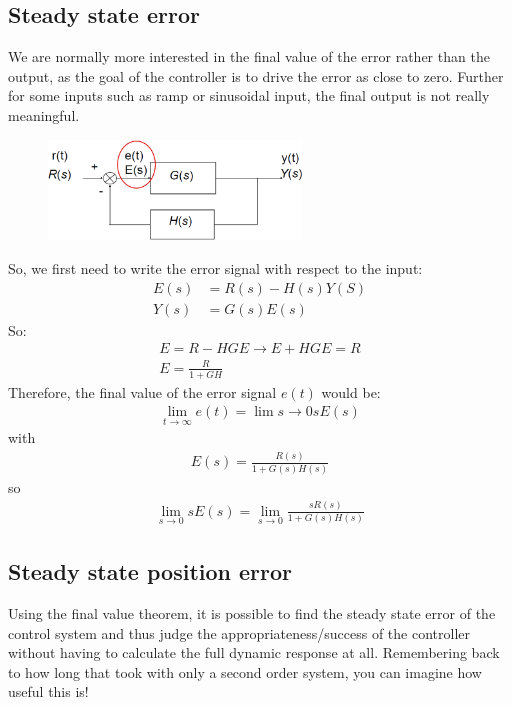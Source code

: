 \documentclass[class=report, crop=false, 12pt,a4paper]{standalone}
\begin{document}
\subsection{Steady state error}
We are normally more interested in the final value of the error rather than the output, as the goal of the controller is to drive the error as close to zero. Further for some inputs such as ramp or sinusoidal input, the final output is not really meaningful.
\begin{figure}[H]
  \centerline{\includegraphics[width = 0.6\textwidth]{../img/diagram104.png}}
  \caption{}
\end{figure}
So, we first need to write the error signal with respect to the input:
\begin{align}
  E(s) &= R(s) - H(s)Y(S)\\
  Y(s) &= G(s)E(s)
\end{align}
So:
\begin{gather}
  E = R - HGE \rightarrow E + HGE = R\\
  E = \frac{R}{1+GH}
\end{gather}
Therefore, the final value of the error signal $e(t)$ would be:
\begin{align}
  \lim_{t\rightarrow \infty} e(t) = \lim{s\rightarrow 0} sE(s)
\end{align}
with
\begin{align}
  E(s) = \frac{R(s)}{1 + G(s) H(s)}
\end{align}
so
\begin{align}
  \lim_{s\rightarrow 0} s E(s) = \lim_{s\rightarrow 0} \frac{sR(s)}{1 + G(s) H(s)}
\end{align}
\subsection{Steady state position error}
Using the final value theorem, it is possible to find the steady state error of the control system and thus judge the appropriateness/success of the controller without having to calculate the full dynamic response at all. Remembering back to how long that took with only a second order system, you can imagine how useful this is!
\end{document}
